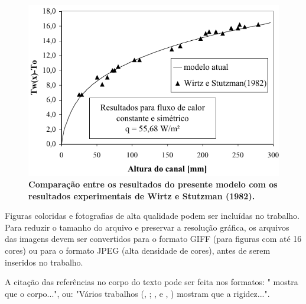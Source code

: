\documentclass[10pt,fleqn,a4paper]{article}
\begin{document}
        \begin{figure}[h]
            \begin{center}
                \includegraphics[angle=0, scale=.8]{figura.pdf}
            \end{center}
            \caption{\textbf{Comparação entre os resultados do presente modelo com os resultados experimentais de Wirtz e Stutzman (1982).}}
        \end{figure}

        Figuras coloridas e fotografias de alta qualidade podem ser incluídas no trabalho. Para reduzir o tamanho do arquivo e preservar a resolução gráfica, os arquivos das imagens devem ser convertidos para o  formato GIFF (para figuras com até 16 cores) ou para o formato JPEG (alta densidade de cores), antes de serem inseridos no trabalho.

        A citação das referências no corpo do texto pode ser feita nos formatos: "\citet{Bordalo89} mostra que o corpo...", ou: "Vários trabalhos (\citeauthor{Coimbra78}, \citeyear{Coimbra78}; \citeauthor{Clark86}, \citeyear{Clark86} e \citeauthor{Sparrow80},  \citeyear{Sparrow80}) mostram que a rigidez...".

        
        
\end{document}
